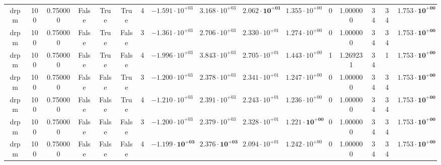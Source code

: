 \begin{table}
\begin{tabular}{cccccccccccccccc}
drpm & 100 & 0.750000 & False & True & True & 4 & $-1.591 \cdot 10^{+03}$ & $3.168 \cdot 10^{+03}$ & $\mathbf{2.062 \cdot 10^{+01}}$ & $1.355 \cdot 10^{+00}$ & 0 & 1.000000 & 34 & 34 & $\mathbf{1.753 \cdot 10^{+00}}$ \\
drpm & 100 & 0.750000 & False & True & False & 3 & $-1.361 \cdot 10^{+03}$ & $2.706 \cdot 10^{+03}$ & $2.330 \cdot 10^{+01}$ & $1.274 \cdot 10^{+00}$ & 0 & 1.000000 & 34 & 34 & $\mathbf{1.753 \cdot 10^{+00}}$ \\
drpm & 100 & 0.750000 & False & True & False & 4 & $-1.996 \cdot 10^{+03}$ & $3.843 \cdot 10^{+03}$ & $2.705 \cdot 10^{+01}$ & $1.443 \cdot 10^{+00}$ & 1 & 1.269231 & 34 & 1 & $\mathbf{1.753 \cdot 10^{+00}}$ \\
drpm & 100 & 0.750000 & False & False & True & 3 & $-1.200 \cdot 10^{+03}$ & $2.378 \cdot 10^{+03}$ & $2.341 \cdot 10^{+01}$ & $1.247 \cdot 10^{+00}$ & 0 & 1.000000 & 34 & 34 & $\mathbf{1.753 \cdot 10^{+00}}$ \\
drpm & 100 & 0.750000 & False & False & True & 4 & $-1.210 \cdot 10^{+03}$ & $2.391 \cdot 10^{+03}$ & $2.243 \cdot 10^{+01}$ & $1.236 \cdot 10^{+00}$ & 0 & 1.000000 & 34 & 34 & $\mathbf{1.753 \cdot 10^{+00}}$ \\
drpm & 100 & 0.750000 & False & False & False & 3 & $-1.200 \cdot 10^{+03}$ & $2.379 \cdot 10^{+03}$ & $2.328 \cdot 10^{+01}$ & $\mathbf{1.221 \cdot 10^{+00}}$ & 0 & 1.000000 & 34 & 34 & $\mathbf{1.753 \cdot 10^{+00}}$ \\
drpm & 100 & 0.750000 & False & False & False & 4 & $\mathbf{-1.199 \cdot 10^{+03}}$ & $\mathbf{2.376 \cdot 10^{+03}}$ & $2.094 \cdot 10^{+01}$ & $1.242 \cdot 10^{+00}$ & 0 & 1.000000 & 34 & 34 & $\mathbf{1.753 \cdot 10^{+00}}$ \\
\bottomrule
\end{tabular}
\end{table}
